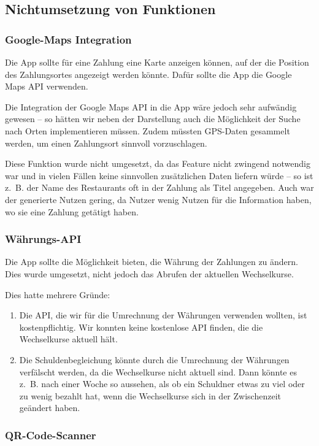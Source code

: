 \subsection{Nichtumsetzung von Funktionen}

\subsubsection{Google-Maps Integration}

Die App sollte für eine Zahlung eine Karte anzeigen können, auf der die Position des Zahlungsortes angezeigt werden könnte.
Dafür sollte die App die Google Maps API verwenden.

Die Integration der Google Maps API in die App wäre jedoch sehr aufwändig gewesen -- so hätten wir neben der Darstellung auch die Möglichkeit der Suche nach Orten implementieren müssen.
Zudem müssten GPS-Daten gesammelt werden, um einen Zahlungsort sinnvoll vorzuschlagen.

Diese Funktion wurde nicht umgesetzt, da das Feature nicht zwingend notwendig war und in vielen Fällen keine sinnvollen zusätzlichen Daten liefern würde -- so ist z. B. der Name des Restaurants oft in der Zahlung als Titel angegeben.
Auch war der generierte Nutzen gering, da Nutzer wenig Nutzen für die Information haben, wo sie eine Zahlung getätigt haben.

\subsubsection{Währungs-API}

Die App sollte die Möglichkeit bieten, die Währung der Zahlungen zu ändern.
Dies wurde umgesetzt, nicht jedoch das Abrufen der aktuellen Wechselkurse.

Dies hatte mehrere Gründe:
\begin{enumerate}
    \item Die API, die wir für die Umrechnung der Währungen verwenden wollten, ist kostenpflichtig. Wir konnten keine kostenlose API finden, die die Wechselkurse aktuell hält.
    \item Die Schuldenbegleichung könnte durch die Umrechnung der Währungen verfälscht werden, da die Wechselkurse nicht aktuell sind. Dann könnte es z. B. nach einer Woche so aussehen, als ob ein Schuldner etwas zu viel oder zu wenig bezahlt hat, wenn die Wechselkurse sich in der Zwischenzeit geändert haben.
\end{enumerate}

\subsubsection{QR-Code-Scanner}

